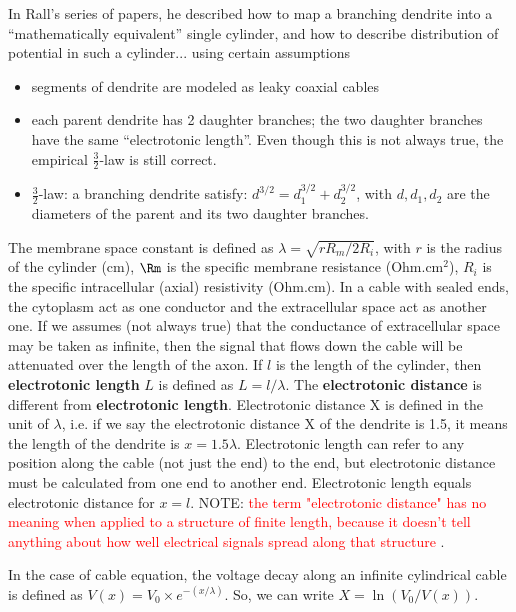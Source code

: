 In Rall's series of papers, he described how to map a branching dendrite into a
``mathematically equivalent'' single cylinder, and how to describe distribution
of potential in such a cylinder... using certain assumptions
\begin{itemize}
\item segments of dendrite are modeled as leaky coaxial cables
\item each parent dendrite has 2 daughter branches; the two daughter branches
have the same ``electrotonic length''. Even though this is not always true, the
empirical $\frac{3}{2}$-law is still correct.
\item $\frac{3}{2}$-law: a branching dendrite satisfy: $d^{3/2} =
  d_1^{3/2}+d_2^{3/2}$, with $d,d_1,d_2$ are the diameters of the parent and
  its two daughter branches.
\end{itemize}

\begin{framed}

The membrane space constant is defined as $\lambda = \sqrt{rR_m/2R_i}$, with $r$
is the radius of the cylinder (cm), $\Rm$ is the specific membrane resistance
(Ohm.cm$^2$), $R_i$ is the specific intracellular (axial) resistivity (Ohm.cm).
In a cable with sealed ends, the cytoplasm act as one conductor and the
extracellular space act as another one. If we assumes (not always true) that the
conductance of extracellular space may be taken as infinite, then the signal
that flows down the cable will be attenuated over the length of the axon. If $l$
is the length of the cylinder, then {\bf electrotonic length} $L$ is defined as
$L=l/\lambda$. The {\bf electrotonic distance} is different from {\bf
electrotonic length}. Electrotonic distance X is defined in the unit of
$\lambda$, i.e. if we say the electrotonic distance X of the dendrite is 1.5, it
means the length of the dendrite is $x=1.5\lambda$. Electrotonic length can
refer to any position along the cable (not just the end) to the end, but
electrotonic distance must be calculated from one end to another end.
Electrotonic length equals electrotonic distance for $x=l$. NOTE:
\textcolor{red}{the term "electrotonic distance" has no meaning when applied to
a structure of finite length, because it doesn't tell anything about how well
electrical signals spread along that structure} \citep{johnston1994fcn}.

In the case of cable equation, the voltage decay along an infinite cylindrical
cable is defined as $V(x) = V_0 \times e^{-(x/\lambda)}$. So, we can write
$X=\ln \left(V_0/V(x)\right)$. 
\end{framed}


